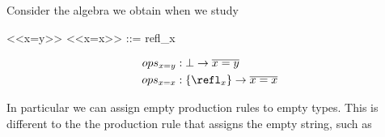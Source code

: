\begin{example}
Consider the algebra we obtain when we study 
\begin{center}
\begin{minipage}{0.45\textwidth}
\begin{Gcode}[]
<<x=y>> 
<<x=x>> ::= refl_x
\end{Gcode}
\end{minipage}
\hfill 
\begin{minipage}{0.5\textwidth}
\begin{align*}
    ops_{x=y} & : \bot \to \overline{x=y}\\
    ops_{x=x} & : \{\refl_x\} \to \overline{x=x}
\end{align*}
\end{minipage}
\end{center}
In particular we can assign empty production rules to empty types.
This is different to the the production rule that assigns the 
empty string, such as 
\end{example}


